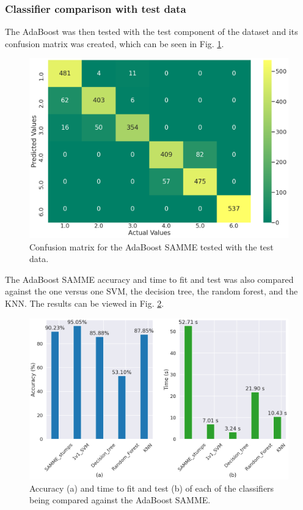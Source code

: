 \documentclass{article}
\begin{document}
\subsubsection{Classifier comparison with test data}
The AdaBoost was then tested with the test component of the dataset and its confusion matrix was created, which can be seen in Fig. \ref{fig:ConfMat}.

\begin{figure}[tb]
    \centering
    \includegraphics[width=\linewidth]{Img/ConfMat.png}
    \caption{Confusion matrix for the AdaBoost SAMME tested with the test data.}
    \label{fig:ConfMat}
\end{figure}

The AdaBoost SAMME accuracy and time to fit and test was also compared against the one versus one SVM, the decision tree, the random forest, and the KNN. The results can be viewed in Fig. \ref{fig:Barplot}.

\begin{figure}[tb]
    \centering
    \includegraphics[width=\linewidth]{Img/Barplot.png}
    \caption{Accuracy (a) and time to fit and test (b) of each of the classifiers being compared against the AdaBoost SAMME.}
    \label{fig:Barplot}
\end{figure}
\end{document}
